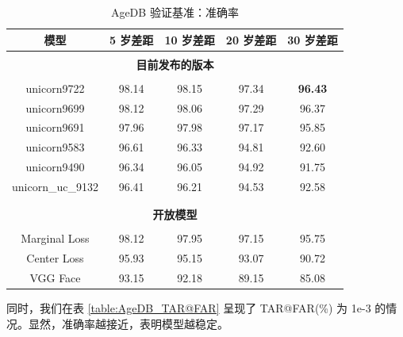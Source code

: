 \documentclass[a4paper, 11pt, UTF8]{ctexart}%
\begin{document}
\begin{table}[h]
\caption{AgeDB 验证基准：准确率}
\label{table:AgeDB_Best_Acc}
\begin{center}
\begin{tabular}{ccccc}
\multicolumn{1}{c}{\bf 模型}  &\multicolumn{1}{c}{\bf 5 岁差距} &\multicolumn{1}{c}{\bf 10 岁差距} &\multicolumn{1}{c}{\bf 20 岁差距} &\multicolumn{1}{c}{\bf 30 岁差距}
\\ \hline \\
\multicolumn{5}{c}{\bf 目前发布的版本}\\
\\
\rowcolor{t_gary}
unicorn9722 &  98.14 & 98.15 & 97.34 & {\color{red} \bf 96.43}  \\
unicorn9699 &  98.12 & 98.06 & 97.29 & 96.37  \\
\rowcolor{t_gary}
unicorn9691 &  97.96 & 97.98 & 97.17 & 95.85  \\
unicorn9583 &  96.61 & 96.33 & 94.81 & 92.60  \\
\rowcolor{t_gary}
unicorn9490 &  96.34 & 96.05 & 94.92 & 91.75  \\
unicorn\_uc\_9132 &  96.41 & 96.21 & 94.53 & 92.58  \\

\\ \hline \\
\multicolumn{5}{c}{\bf 开放模型}\\
\\
\rowcolor{t_gary}
Marginal Loss &  98.12 & 97.95 & 97.15 & 95.75 \\
Center Loss &  95.93 & 95.15 & 93.07 & 90.72 \\
\rowcolor{t_gary}
VGG Face &  93.15 & 92.18 & 89.15 & 85.08 \\
\end{tabular}
\end{center}
\end{table}

同时，我们在表 \ref{table:AgeDB_TAR@FAR} 呈现了 TAR@FAR(\%) 为 1e-3 的情况。显然，准确率越接近，表明模型越稳定。
\end{document}
